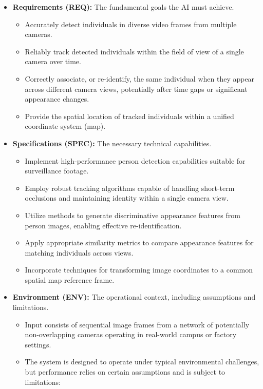 \begin{itemize}
    \item \textbf{Requirements (REQ):} The fundamental goals the AI must achieve.
        \begin{itemize}
            \item Accurately detect individuals in diverse video frames from multiple cameras.
            \item Reliably track detected individuals within the field of view of a single camera over time.
            \item Correctly associate, or re-identify, the same individual when they appear across different camera views, potentially after time gaps or significant appearance changes.
            \item Provide the spatial location of tracked individuals within a unified coordinate system (map).
        \end{itemize}
    \item \textbf{Specifications (SPEC):} The necessary technical capabilities.
        \begin{itemize}
            \item Implement high-performance person detection capabilities suitable for surveillance footage.
            \item Employ robust tracking algorithms capable of handling short-term occlusions and maintaining identity within a single camera view.
            \item Utilize methods to generate discriminative appearance features from person images, enabling effective re-identification.
            \item Apply appropriate similarity metrics to compare appearance features for matching individuals across views.
            \item Incorporate techniques for transforming image coordinates to a common spatial map reference frame.
        \end{itemize}
    \item \textbf{Environment (ENV):} The operational context, including assumptions and limitations.
        \begin{itemize}
            \item Input consists of sequential image frames from a network of potentially non-overlapping cameras operating in real-world campus or factory settings.
            \item The system is designed to operate under typical environmental challenges, but performance relies on certain assumptions and is subject to limitations:

\end{itemize}
\end{itemize}
